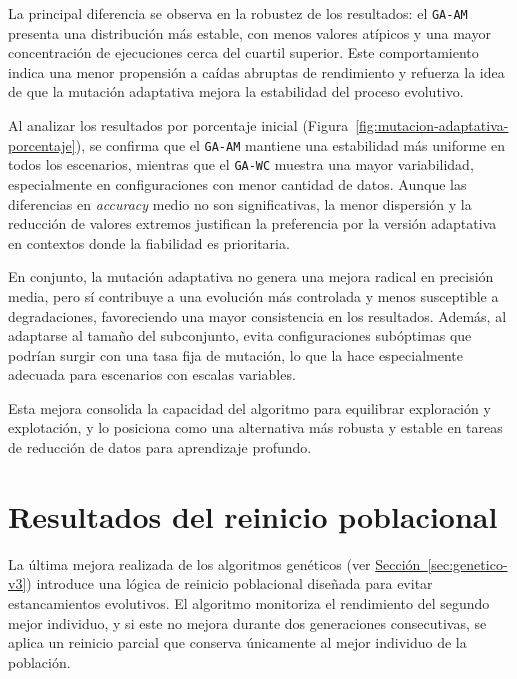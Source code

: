 La principal diferencia se observa en la robustez de los resultados: el \texttt{GA-AM} presenta una distribución más estable,
con menos valores atípicos y una mayor concentración de ejecuciones cerca del cuartil superior.
Este comportamiento indica una menor propensión a caídas abruptas de rendimiento y refuerza la idea de que la mutación
adaptativa mejora la estabilidad del proceso evolutivo.

Al analizar los resultados por porcentaje inicial (Figura~\ref{fig:mutacion-adaptativa-porcentaje}),
se confirma que el \texttt{GA-AM} mantiene una estabilidad más uniforme en todos los escenarios, mientras que el \texttt{GA-WC} muestra una mayor variabilidad,
especialmente en configuraciones con menor cantidad de datos.
Aunque las diferencias en \textit{accuracy} medio no son significativas, la menor dispersión y la reducción de valores extremos justifican la
preferencia por la versión adaptativa en contextos donde la fiabilidad es prioritaria.

En conjunto, la mutación adaptativa no genera una mejora radical en precisión media,
pero sí contribuye a una evolución más controlada y menos susceptible a degradaciones, favoreciendo una mayor consistencia en los resultados.
Además, al adaptarse al tamaño del subconjunto, evita configuraciones subóptimas que podrían surgir con una tasa fija de mutación,
lo que la hace especialmente adecuada para escenarios con escalas variables.

Esta mejora consolida la capacidad del algoritmo para equilibrar exploración y explotación,
y lo posiciona como una alternativa más robusta y estable en tareas de reducción de datos para aprendizaje profundo.


\section{Resultados del reinicio poblacional}\label{sec:resultados-reinicio-poblacional}
La última mejora realizada de los algoritmos genéticos (ver \hyperref[sec:genetico-v3]{Sección~\ref*{sec:genetico-v3}})
introduce una lógica de reinicio poblacional diseñada para evitar estancamientos evolutivos.
El algoritmo monitoriza el rendimiento del segundo mejor individuo, y si este no mejora durante dos generaciones consecutivas,
se aplica un reinicio parcial que conserva únicamente al mejor individuo de la población.

